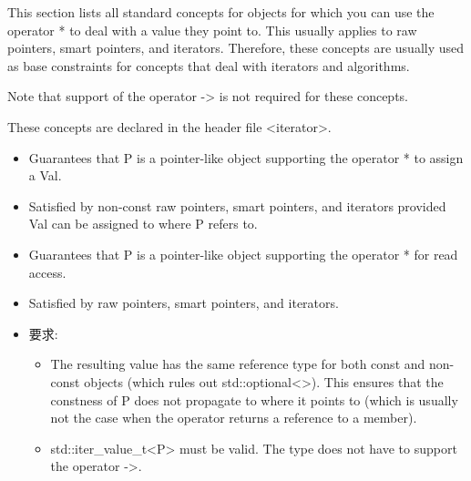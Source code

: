 
This section lists all standard concepts for objects for which you can use the operator * to deal with a value they point to. This usually applies to raw pointers, smart pointers, and iterators. Therefore, these concepts are usually used as base constraints for concepts that deal with iterators and algorithms.

Note that support of the operator -> is not required for these concepts.

These concepts are declared in the header file <iterator>.




\begin{itemize}
\item
Guarantees that P is a pointer-like object supporting the operator * to assign a Val.
	
\item
Satisfied by non-const raw pointers, smart pointers, and iterators provided Val can be assigned to where P refers to.
\end{itemize}



\begin{itemize}
\item
Guarantees that P is a pointer-like object supporting the operator * for read access.

\item
Satisfied by raw pointers, smart pointers, and iterators.


\item
要求:
\begin{itemize}
\item
The resulting value has the same reference type for both const and non-const objects (which rules out std::optional<>). This ensures that the constness of P does not propagate to where it points to (which is usually not the case when the operator returns a reference to a member).

\item
std::iter\_value\_t<P> must be valid. The type does not have to support the operator ->.
\end{itemize}
\end{itemize}


